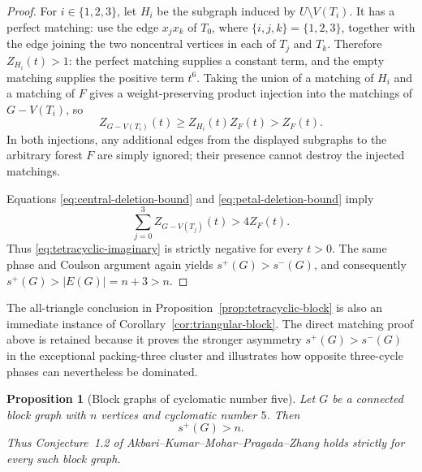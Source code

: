 \documentclass[11pt]{article}
\newtheorem{proposition}[theorem]{Proposition}
\theoremstyle{definition}
\theoremstyle{remark}
\begin{document}
\begin{proof}
For $i\in\{1,2,3\}$, let $H_i$ be the subgraph induced by
$U\setminus V(T_i)$.  It has a perfect matching: use the edge
$x_jx_k$ of $T_0$, where $\{i,j,k\}=\{1,2,3\}$, together with the edge
joining the two noncentral vertices in each of $T_j$ and $T_k$.  Therefore
$Z_{H_i}(t)>1$: the perfect matching supplies a constant term, and the
empty matching supplies the positive term $t^6$.  Taking the union of a
matching of $H_i$ and a matching of $F$ gives a weight-preserving product
injection into the matchings of $G-V(T_i)$, so
\begin{equation}\label{eq:petal-deletion-bound}
 Z_{G-V(T_i)}(t)\ge Z_{H_i}(t)Z_F(t)>Z_F(t).
\end{equation}
In both injections, any additional edges from the displayed subgraphs to
the arbitrary forest $F$ are simply ignored; their presence cannot destroy
the injected matchings.

Equations \eqref{eq:central-deletion-bound} and
\eqref{eq:petal-deletion-bound} imply
\[
 \sum_{j=0}^3Z_{G-V(T_j)}(t)>4Z_F(t).
\]
Thus \eqref{eq:tetracyclic-imaginary} is strictly negative for every
$t>0$.  The same phase and Coulson argument again yields
$s^+(G)>s^-(G)$, and consequently
$s^+(G)>|E(G)|=n+3>n$.
\end{proof}

The all-triangle conclusion in Proposition~\ref{prop:tetracyclic-block} is
also an immediate instance of Corollary~\ref{cor:triangular-block}.  The
direct matching proof above is retained because it proves the stronger
asymmetry $s^+(G)>s^-(G)$ in the exceptional packing-three cluster and
illustrates how opposite three-cycle phases can nevertheless be dominated.

\begin{proposition}[Block graphs of cyclomatic number five]
\label{prop:beta-five-block}
Let $G$ be a connected block graph with $n$ vertices and cyclomatic number
$5$.  Then
\[
 s^+(G)>n.
\]
Thus Conjecture~1.2 of Akbari--Kumar--Mohar--Pragada--Zhang holds strictly
for every such block graph.
\end{proposition}
\end{document}
